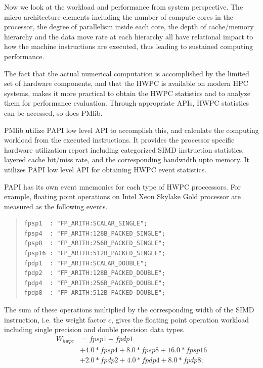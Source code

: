 \documentclass[conference]{IEEEtran}
\begin{document}
Now we look at the workload and performance from system perspective.
The micro architecture elements including the number of compute cores
in the processor, the degree of parallelism inside each core,
the depth of cache/memory hierarchy and the data move rate at each hierarchy
all have relational impact to how the machine instructions are executed,
thus leading to sustained computing performance.

The fact that the actual numerical computation is accomplished by the
limited set of hardware components, and that the HWPC is available
on modern HPC systems, makes it more practical to obtain the HWPC statistics
and to analyze them for performance evaluation.
Through appropriate APIs, HWPC statistics can be accessed, so does PMlib.

PMlib utilize PAPI \cite{papi-1} low level API to accomplish this,
and calculate the computing workload from the executed instructions.
It provides the processor specific hardware utilization report
including categorized SIMD instruction statistics,
layered cache hit/miss rate, and the corresponding bandwidth upto memory.
It utilizes PAPI low level API for obtaining HWPC event statistics.

PAPI has its own event mnemonics for each type of HWPC proccessors.
For example, floating point operations on
Intel Xeon Skylake Gold \cite{skylake-1} processor
are measured as the following events.

\begin{quote}
\begin{small}
\begin{verbatim}
fpsp1  : "FP_ARITH:SCALAR_SINGLE";
fpsp4  : "FP_ARITH:128B_PACKED_SINGLE";
fpsp8  : "FP_ARITH:256B_PACKED_SINGLE";
fpsp16 : "FP_ARITH:512B_PACKED_SINGLE";
fpdp1  : "FP_ARITH:SCALAR_DOUBLE";
fpdp2  : "FP_ARITH:128B_PACKED_DOUBLE";
fpdp4  : "FP_ARITH:256B_PACKED_DOUBLE";
fpdp8  : "FP_ARITH:512B_PACKED_DOUBLE";
\end{verbatim}
\end{small}
\end{quote}

The sum of these operations multiplied by the corresponding width
of the SIMD instruction, i.e. the weight factor $ c $, gives the
floating point operation workload including single precision
and double precision data types.
\begin{align}
	W_{hwpc} & = fpsp1 + fpdp1 \nonumber \\
			& + 4.0*fpsp4 + 8.0*fpsp8 + 16.0*fpsp16 \nonumber \\
			& + 2.0*fpdp2 + 4.0*fpdp4 + 8.0*fpdp8;
\end{align}
\end{document}
